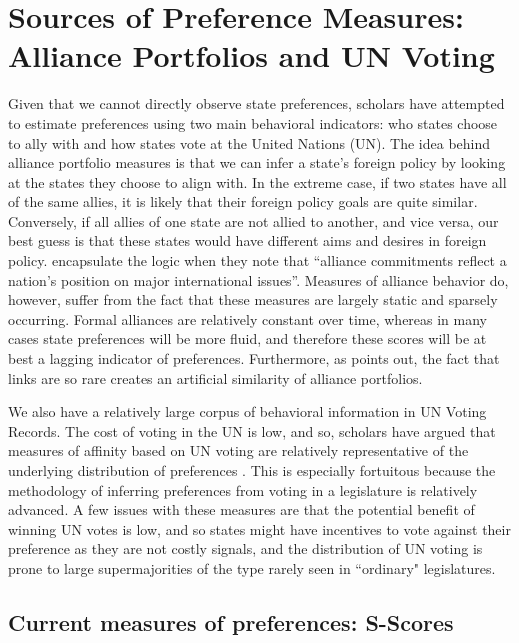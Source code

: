 \section*{Sources of Preference Measures: Alliance Portfolios and UN Voting}

Given that we cannot directly observe state preferences, scholars have attempted to estimate preferences using two main behavioral indicators: who states choose to ally with and how states vote at the United Nations (UN). The idea behind alliance portfolio measures is that we can infer a state's foreign policy by looking at the states they choose to align with. In the extreme case, if two states have all of the same allies, it is likely that their foreign policy goals are quite similar. Conversely, if all allies of one state are not allied to another, and vice versa, our best guess is that these states would have different aims and desires in foreign policy. \citet{buenodemesquita:lalman:2008} encapsulate the logic when they note that ``alliance commitments reflect a nation's position on major international issues''. Measures of alliance behavior do, however, suffer from the fact that these measures are largely static and sparsely occurring. Formal alliances are relatively constant over time, whereas in many cases state preferences will be more fluid, and therefore these scores will be at best a lagging indicator of preferences. Furthermore, as \citet{hage:2011} points out, the fact that links are so rare creates an artificial similarity of alliance portfolios.

We also have a relatively large corpus of behavioral information in UN Voting Records. The cost of voting in the UN is low, and so, scholars have argued that measures of affinity based on UN voting are relatively representative of the underlying distribution of preferences \citep{gartzke:1998}. This is especially fortuitous because the methodology of inferring preferences from voting in a legislature is relatively advanced. A few issues with these measures are that the potential benefit of winning UN votes is low, and so states might have incentives to vote against their preference as they are not costly signals, and the distribution of UN voting is prone to large supermajorities of the type rarely seen in ``ordinary" legislatures.

\subsection*{Current measures of preferences: S-Scores}

